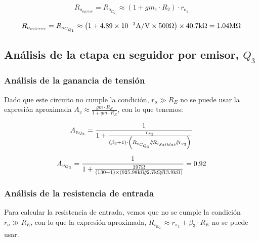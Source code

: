 \begin{equation}
R_{o_{mirror}} = R_{o_{C_{Q_{1}}}} \approx \left( 1 + gm_{1} \cdot R_{2} \right) \cdot r_{o_{1}}
\end{equation} 

\begin{equation*}
R_{o_{mirror}} = R_{o_{C_{Q_{1}}}} \approx \left( 1 + \num{4.89E-2} \si[per-mode=symbol]{\ampere\per\volt}  \times 500 \si[per-mode=symbol]{\ohm}  \right) \times 40.7 \si[per-mode=symbol]{\kilo\ohm} = 1.04 \si[per-mode=symbol]{\mega\ohm}
\end{equation*} 

\subsection{Análisis de la etapa en seguidor por emisor, $Q_{3}$}


\subsubsection{Análisis de la ganancia de tensión}

Dado que este circuito no cumple la condición, $r_{o} \gg R_{E}$ no se puede usar la expresión aproximada $A_{v} \approx \frac{gm \cdot R_{E}}{1 + gm \cdot R_{E}}$, con lo que tenemos:

\begin{equation}
A_{v_{Q_{3}}} = \frac{1}{1 + \frac{r_{\pi_{3}}}{  \left(  \beta_{3} + 1 \right) \cdot \left(  R_{o_{C_{Q_{6}}}} \parallelresistors R_{i_{Sziklai}} \parallelresistors r_{o_{3}}  \right)  } }
\end{equation}

\begin{equation*}
A_{v_{Q_{3}}} = \frac{1}{1 + \frac { 197 \si[per-mode=symbol]{\ohm} }{  \left(  130 + 1 \right) \times \left(  925.98 \si[per-mode=symbol]{\kilo\ohm} \parallelresistors 2.7 \si[per-mode=symbol]{\kilo\ohm} \parallelresistors 13.9 \si[per-mode=symbol]{\kilo\ohm}  \right)  } } = 0.92
\end{equation*}

\subsubsection{Análisis de la resistencia de entrada}


Para calcular la  resistencia de entrada, vemos que no se cumple la condición $r_{o} \gg R_{E}$, con lo que la expresión aproximada, $ R_{i_{B_{Q_{3}}}} \approx r_{\pi_{3}} + \beta_{3} \cdot R_{E}$ no se puede usar.\\ \\

